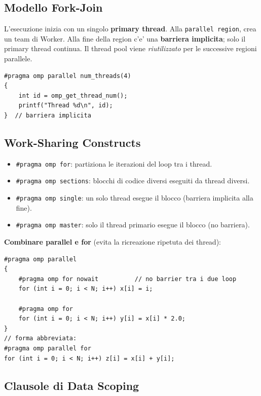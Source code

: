 \documentclass[11pt,a4paper]{article}
\theoremstyle{remark}
\begin{document}
\subsection{Modello Fork-Join}

L'esecuzione inizia con un singolo \textbf{primary thread}. Alla \lstinline|parallel region|, crea un team di Worker. Alla fine della region c'e' una \textbf{barriera implicita}; solo il primary thread continua. Il thread pool viene \emph{riutilizzato} per le successive regioni parallele.

\begin{lstlisting}[style=cpp]
#pragma omp parallel num_threads(4)
{
    int id = omp_get_thread_num();
    printf("Thread %d\n", id);
}  // barriera implicita
\end{lstlisting}

\subsection{Work-Sharing Constructs}

\begin{itemize}
  \item \lstinline|#pragma omp for|: partiziona le iterazioni del loop tra i thread.
  \item \lstinline|#pragma omp sections|: blocchi di codice diversi eseguiti da thread diversi.
  \item \lstinline|#pragma omp single|: un solo thread esegue il blocco (barriera implicita alla fine).
  \item \lstinline|#pragma omp master|: solo il thread primario esegue il blocco (no barriera).
\end{itemize}

\textbf{Combinare parallel e for} (evita la ricreazione ripetuta dei thread):
\begin{lstlisting}[style=cpp]
#pragma omp parallel
{
    #pragma omp for nowait          // no barrier tra i due loop
    for (int i = 0; i < N; i++) x[i] = i;

    #pragma omp for
    for (int i = 0; i < N; i++) y[i] = x[i] * 2.0;
}
// forma abbreviata:
#pragma omp parallel for
for (int i = 0; i < N; i++) z[i] = x[i] + y[i];
\end{lstlisting}

\subsection{Clausole di Data Scoping}
\end{document}
